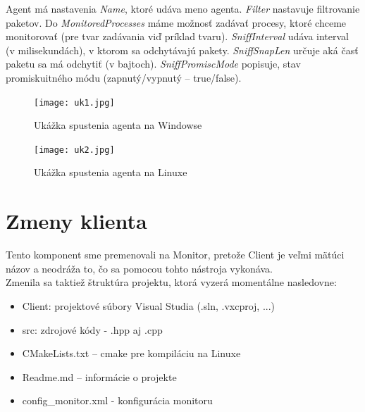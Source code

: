 \documentclass[a4paper,12pt]{article}
\begin{document}
Agent má nastavenia \textit{Name}, ktoré udáva meno agenta. \textit{Filter} nastavuje filtrovanie paketov. Do \textit{MonitoredProcesses} máme možnosť zadávať procesy, ktoré chceme monitorovať (pre tvar zadávania viď príklad tvaru). \textit{SniffInterval} udáva interval (v milisekundách), v ktorom sa odchytávajú pakety. \textit{SniffSnapLen} určuje aká časť paketu sa má odchytiť (v bajtoch). \textit{SniffPromiscMode} popisuje, stav promiskuitného módu (zapnutý/vypnutý – true/false). \\

\begin{figure}[h!]
	\centering
	\label{graf1}
	\texttt{[image: uk1.jpg]}
	\caption{Ukážka spustenia agenta na Windowse}
\end{figure}

\begin{figure}[h!]
	\centering
	\label{graf1}
	\texttt{[image: uk2.jpg]}
	\caption{Ukážka spustenia agenta na Linuxe}
\end{figure}

\section{Zmeny klienta}

Tento komponent sme premenovali na Monitor, pretože Client je veľmi mätúci názov a neodráža to, čo sa pomocou tohto nástroja vykonáva. \\

\noindent Zmenila sa taktiež štruktúra projektu, ktorá vyzerá momentálne nasledovne:
\begin{itemize} 
	\item Client: projektové súbory Visual Studia (.sln, .vxcproj, ...) 
	\item src: zdrojové kódy - .hpp aj .cpp 
	\item CMakeLists.txt – cmake pre kompiláciu na Linuxe 
	\item Readme.md – informácie o projekte 
	\item config\_monitor.xml - konfigurácia monitoru\\
\end{itemize}
\end{document}

